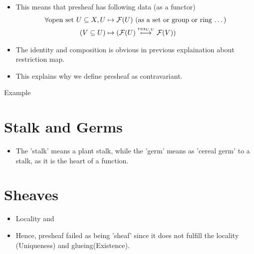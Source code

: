 \documentclass[10pt,aspectratio=1610]{beamer}
\theoremstyle{definition}
\begin{document}
    \begin{frame}
        \begin{itemize}
            \item This means that presheaf has following data (as a functor)
            \begin{align*}
                \forall \text{open set } U \subseteq X, U  &\mapsto \mathcal{F}(U) \text{ (as a set or group or ring \dots)} \\
                (V\subseteq U) & \mapsto (\mathcal{F}(U) \overset{res_{U, V}}{\longmapsto} \mathcal{F}(V))
            \end{align*}
            \item The identity and composition is obvious in previous explaination about restriction map.
            \item This explains why we define presheaf as contravariant.
            

        \end{itemize}
        
    \end{frame}

    \begin{frame}{Example}
        
    \end{frame}

    \section{Stalk and Germs}
    \begin{frame}
        \begin{itemize}
            \item The 'stalk' means a plant stalk, while the 'germ' means as 'cereal germ' to a stalk, as it is the heart of a function.
        \end{itemize}
        
    \end{frame}


    \section{Sheaves}

    \begin{frame}
        \begin{itemize}
            \item Locality and 
            \item Hence, presheaf failed as being 'sheaf' since it does not fulfill the locality (Uniqueness) and glueing(Existence).
        \end{itemize}
        
    \end{frame}
    
\end{document}
